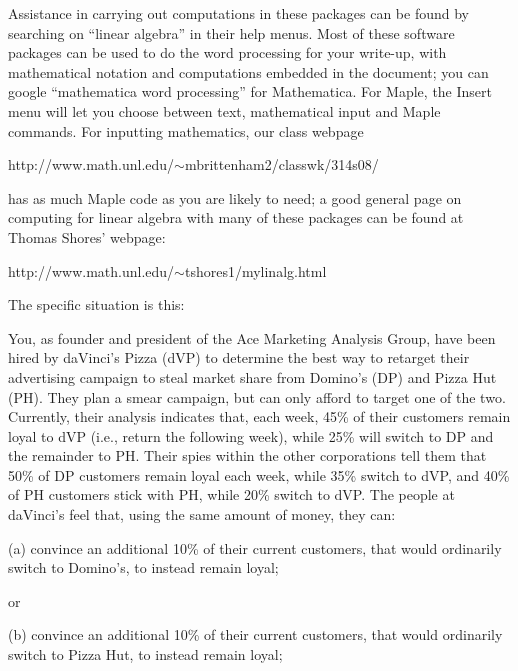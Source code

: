 Assistance in carrying out computations in these packages can be found by 
searching on ``linear algebra'' in their help menus.
Most of these software packages can be used to do the word processing for your 
write-up, with mathematical notation and computations embedded in the document;
you can google ``mathematica word processing'' for Mathematica. For Maple, the 
Insert menu will let you choose between text, mathematical input and Maple commands.
For inputting mathematics, our class webpage

\msk

http://www.math.unl.edu/$\sim$mbrittenham2/classwk/314s08/

\msk

has as much Maple code as you are likely to need; a good general page on computing
for linear algebra with many of these packages can be found at Thomas Shores' webpage:

\msk

http://www.math.unl.edu/$\sim$tshores1/mylinalg.html

\vfill\eject

The specific situation is this:

\medskip

You, as founder and president of the Ace Marketing Analysis Group, have been hired
by daVinci's Pizza (dVP) to determine the best way to retarget their advertising 
campaign to 
steal market share from Domino's (DP) and Pizza Hut (PH). They plan a smear campaign, 
but can only 
afford to target one of the two. Currently, their analysis indicates that, each 
week, 45\% of their customers remain loyal to dVP (i.e., return the 
following week), while 25\% will switch to 
DP and the remainder to PH. Their spies within the other corporations tell them that
50\% of DP customers remain loyal each week, while 35\% switch to dVP, and 40\%
of PH customers stick with PH, while 20\% switch to dVP. The people at daVinci's
feel that, using the same amount of money, they can:

\medskip

(a) convince an additional 10\% of their current customers, that would ordinarily 
switch to Domino's, to instead remain loyal;

\smallskip

or

\smallskip

(b) convince an additional 10\% of their current customers, that would ordinarily 
switch to Pizza Hut, to instead remain loyal;

